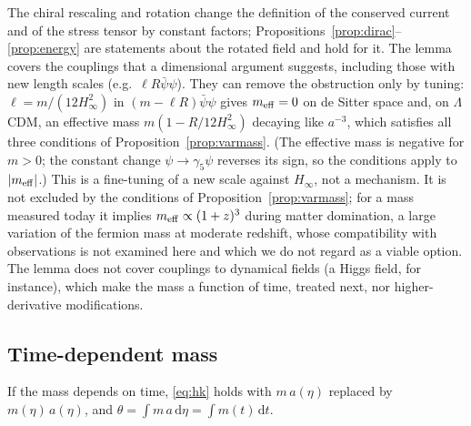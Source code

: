 \documentclass[11pt,a4paper]{article}
\theoremstyle{definition}
\newcommand{\dd}{\mathrm{d}}
\begin{document}
The chiral rescaling and rotation change the definition of the conserved current and of the stress tensor by constant factors; Propositions~\ref{prop:dirac}--\ref{prop:energy} are statements about the rotated field and hold for it. The lemma covers the couplings that a dimensional argument suggests, including those with new length scales (e.g.\ $\ell R\bar\psi\psi$). They can remove the obstruction only by tuning: $\ell=m/(12H_{\infty}^{2})$ in $(m-\ell R)\bar\psi\psi$ gives $m_{\rm eff}=0$ on de Sitter space and, on $\Lambda$CDM, an effective mass $m(1-R/12H_{\infty}^{2})$ decaying like $a^{-3}$, which satisfies all three conditions of Proposition~\ref{prop:varmass}. (The effective mass is negative for $m>0$; the constant change $\psi\to\gamma_{5}\psi$ reverses its sign, so the conditions apply to $|m_{\rm eff}|$.) This is a fine-tuning of a new scale against $H_{\infty}$, not a mechanism. It is not excluded by the conditions of Proposition~\ref{prop:varmass}; for a mass measured today it implies $m_{\rm eff}\propto(1+z)^{3}$ during matter domination, a large variation of the fermion mass at moderate redshift, whose compatibility with observations is not examined here and which we do not regard as a viable option. The lemma does not cover couplings to dynamical fields (a Higgs field, for instance), which make the mass a function of time, treated next, nor higher-derivative modifications.

\subsection{Time-dependent mass}
\label{sec:varmass}

If the mass depends on time, \eqref{eq:hk} holds with $m\,a(\eta)$ replaced by $m(\eta)\,a(\eta)$, and $\theta=\int m\,a\,\dd\eta=\int m(t)\,\dd t$.
\end{document}
